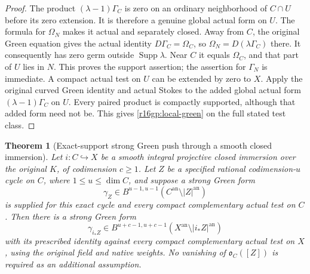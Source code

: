 \documentclass[11pt,a4paper]{article}
\newtheorem{theorem}{Theorem}[section]
\theoremstyle{definition}
\theoremstyle{remark}
\numberwithin{equation}{section}
\begin{document}
\begin{proof}
The product $(\lambda-1)\Gamma_C$ is zero on an ordinary
neighborhood of $C\cap U$ before its zero extension.  It is
therefore a genuine global actual form on $U$.  The formula for
$\Omega_N$ makes it actual and separately closed.  Away from $C$,
the original Green equation gives the actual identity
$D\Gamma_C=\Omega_C$, so $\Omega_N=D(\lambda\Gamma_C)$ there.
It consequently has zero germ outside $\operatorname{Supp}\lambda$.
Near $C$ it equals $\Omega_C$, and that part of $U$ lies in $N$.
This proves the support assertion; the assertion for $\Gamma_N$
is immediate.  A compact actual test on $U$ can be extended by
zero to $X$.  Apply the original curved Green identity and actual
Stokes to the added global actual form
$(\lambda-1)\Gamma_C$ on $U$.  Every paired product is compactly
supported, although that added form need not be.  This gives
\eqref{r16gp:local-green} on the full stated test class.
\end{proof}

\begin{theorem}[Exact-support strong Green push through a smooth closed immersion]
\label{r16gp:push}
Let $i:C\hookrightarrow X$ be a smooth integral projective closed
immersion over the original $K$, of codimension $c\geq1$.
Let $Z$ be a specified rational codimension-$u$ cycle on $C$,
where $1\leq u\leq\dim C$, and suppose a strong Green form
\[
 \gamma_Z\in B^{u-1,u-1}(C^{\mathrm{an}}\setminus|Z|^{\mathrm{an}})
\]
is supplied for this exact cycle and every compact complementary
actual test on $C$.  Then there is a strong Green form
\[
 \gamma_{i_*Z}\in
 B^{u+c-1,u+c-1}(X^{\mathrm{an}}\setminus|i_*Z|^{\mathrm{an}})
 \tag{GP16.3}\label{r16gp:output}
\]
with its prescribed identity against every compact complementary
actual test on $X$, using the original field and native weights.
No vanishing of $\mathfrak o_C([Z])$ is required as an additional
assumption.
\end{theorem}
\end{document}
